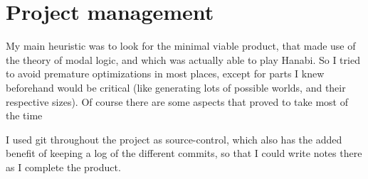 \section{Project management}

My main heuristic was to look for the minimal viable product, that made use of the theory of modal logic, and which was actually able to play Hanabi. So I tried to avoid premature optimizations in most places, except for parts I knew beforehand would be critical (like generating lots of possible worlds, and their respective sizes). Of course there are some aspects that proved to take most of the time

I used git throughout the project as source-control, which also has the added benefit of keeping a log of the different commits, so that I could write notes there as I complete the product.

